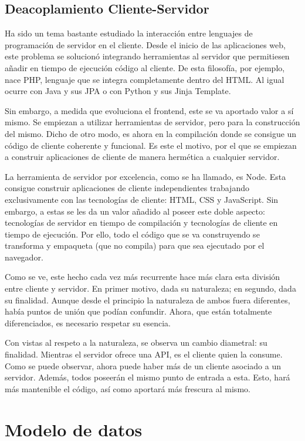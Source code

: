 \subsection{Deacoplamiento Cliente-Servidor}
Ha sido un tema bastante estudiado la interacción entre lenguajes de programación de servidor en el cliente. Desde el inicio de las aplicaciones web, este problema se solucionó integrando herramientas al servidor que permitiesen añadir en tiempo de ejecución código al cliente. De esta filosofía, por ejemplo, nace PHP, lenguaje que se integra completamente dentro del HTML. Al igual ocurre con Java y sus JPA o con Python y sus Jinja Template.

Sin embargo, a medida que evoluciona el frontend, este se va aportado valor a sí mismo. Se empiezan a utilizar herramientas de servidor, pero para la construcción del mismo. Dicho de otro modo, es ahora en la compilación donde se consigue un código de cliente coherente y funcional. Es este el motivo, por el que se empiezan a construir aplicaciones de cliente de manera hermética a cualquier servidor.

La herramienta de servidor por excelencia, como se ha llamado, es Node. Esta consigue construir aplicaciones de cliente independientes trabajando exclusivamente con las tecnologías de cliente: HTML, CSS y JavaScript. Sin embargo, a estas se les da un valor añadido al poseer este doble aspecto: tecnologías de servidor en tiempo de compilación y tecnologías de cliente en tiempo de ejecución. Por ello, todo el código que se va construyendo se transforma y empaqueta (que no compila) para que sea ejecutado por el navegador.

Como se ve, este hecho cada vez más recurrente hace más clara esta división entre cliente y servidor. En primer motivo, dada su naturaleza; en segundo, dada su finalidad. Aunque desde el principio la naturaleza de ambos fuera diferentes, había puntos de unión que podían confundir. Ahora, que están totalmente diferenciados, es necesario respetar su esencia.

Con vistas al respeto a la naturaleza, se observa un cambio diametral: su finalidad. Mientras el servidor ofrece una API, es el cliente quien la consume. Como se puede observar, ahora puede haber más de un cliente asociado a un servidor. Además, todos poseerán el mismo punto de entrada a esta. Esto, hará más mantenible el código, así como aportará más frescura al mismo.

\section{Modelo de datos}\label{sec:modelo_datos}

